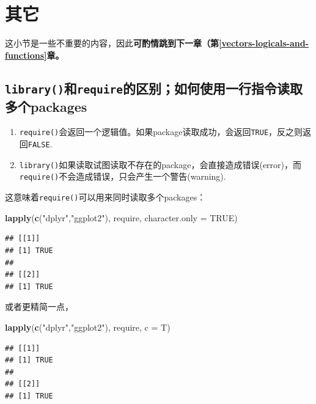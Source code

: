\documentclass[]{book}
\newenvironment{Shaded}{\begin{snugshade}}{\end{snugshade}}
\newcommand{\DataTypeTok}[1]{\textcolor[rgb]{0.13,0.29,0.53}{#1}}
\newcommand{\KeywordTok}[1]{\textcolor[rgb]{0.13,0.29,0.53}{\textbf{#1}}}
\newcommand{\NormalTok}[1]{#1}
\newcommand{\OtherTok}[1]{\textcolor[rgb]{0.56,0.35,0.01}{#1}}
\newcommand{\StringTok}[1]{\textcolor[rgb]{0.31,0.60,0.02}{#1}}
\providecommand{\tightlist}{%
  \setlength{\itemsep}{0pt}\setlength{\parskip}{0pt}}
\begin{document}
\section{其它}

这小节是一些不重要的内容，因此\textbf{可酌情跳到下一章（第\ref{vectors-logicals-and-functions}章。}

\hypertarget{require-and-library}{%
\subsection{\texorpdfstring{\texttt{library()}和\texttt{require}的区别；如何使用一行指令读取多个packages}{library()和require的区别；如何使用一行指令读取多个packages}}\label{require-and-library}}

\begin{enumerate}
\def\labelenumi{\arabic{enumi}.}
\tightlist
\item
  \texttt{require()}会返回一个逻辑值。如果package读取成功，会返回\texttt{TRUE}，反之则返回\texttt{FALSE}.
\item
  \texttt{library()}如果读取试图读取不存在的package，会直接造成错误(error)，而\texttt{require()}不会造成错误，只会产生一个警告(warning).
\end{enumerate}

这意味着\texttt{require()}可以用来同时读取多个packages：

\begin{Shaded}
\begin{Highlighting}[]
\KeywordTok{lapply}\NormalTok{(}\KeywordTok{c}\NormalTok{(}\StringTok{"dplyr"}\NormalTok{,}\StringTok{"ggplot2"}\NormalTok{), require, }\DataTypeTok{character.only =} \OtherTok{TRUE}\NormalTok{)}
\end{Highlighting}
\end{Shaded}

\begin{verbatim}
## [[1]]
## [1] TRUE
## 
## [[2]]
## [1] TRUE
\end{verbatim}

或者更精简一点，

\begin{Shaded}
\begin{Highlighting}[]
\KeywordTok{lapply}\NormalTok{(}\KeywordTok{c}\NormalTok{(}\StringTok{"dplyr"}\NormalTok{,}\StringTok{"ggplot2"}\NormalTok{), require, }\DataTypeTok{c =}\NormalTok{ T)}
\end{Highlighting}
\end{Shaded}

\begin{verbatim}
## [[1]]
## [1] TRUE
## 
## [[2]]
## [1] TRUE
\end{verbatim}
\end{document}
